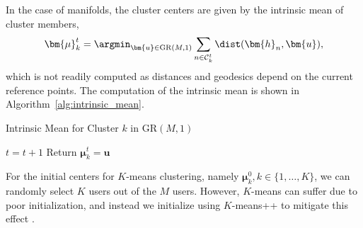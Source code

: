 In the case of manifolds, the cluster centers are given by the intrinsic mean of cluster members,
\begin{align}
	\bm{\mu}_k^t=\argmin_{\bm{u}\in\mathrm{GR}(M,1)}\sum_{n \in {\mathcal{C}_k^t}} \dist(\bm{h}_n,\bm{u}),
\end{align}
which is not readily computed as distances and geodesics depend on the current reference points. The computation of the intrinsic mean is shown in Algorithm~\ref{alg:intrinsic_mean}.
\begin{algorithm}[H]
	\caption{Intrinsic Mean for Cluster $k$ in $\mathrm{GR}(M,1)$}
	\label{alg:intrinsic_mean}
	\begin{algorithmic}[1]
		\State $t=t+1$
		\EndWhile
		\State Return $\bm{\mu}_k^t=\bm{u}$
	\end{algorithmic}
\end{algorithm}

For the initial centers for $K$-means clustering, namely ${\bm{\mu}}_k^0, k \in \{1,\ldots,K\}$, we can randomly select $K$ users out of the $M$ users. However, $K$-means can suffer due to poor initialization, and instead we initialize using $K$-means++ to mitigate this effect \cite{Arthur2007kmeanspp}.

